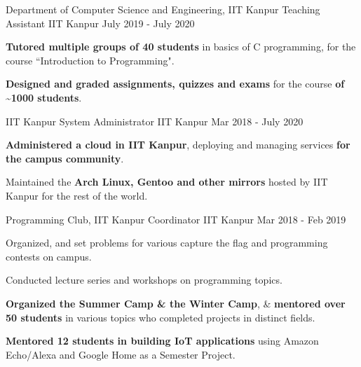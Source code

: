 

\begin{cventries}

  \extraentry
  {Department of Computer Science and Engineering, IIT Kanpur}
  {Teaching Assistant}
  {IIT Kanpur}
  {July 2019 - July 2020}
  {
    \begin{cvitems}
    \item \textbf{Tutored multiple groups of 40 students} in basics of C programming, for the course ``Introduction to Programming".
    \item \textbf{Designed and graded assignments, quizzes and exams} for the course \textbf{of \textasciitilde 1000 students}.
    \end{cvitems}
  }

  \extraentry
  {IIT Kanpur}
  {System Administrator}
  {IIT Kanpur}
  {Mar 2018 - July 2020}
  {
    \begin{cvitems}
    \item \textbf{Administered a cloud in IIT Kanpur}, deploying and managing services \textbf{for the campus community}.
    \item Maintained the \textbf{Arch Linux, Gentoo and other mirrors} hosted by IIT Kanpur for the rest of the world.
    \end{cvitems}
  }

  \extraentry
  {Programming Club, IIT Kanpur}
  {Coordinator}
  {IIT Kanpur}
  {Mar 2018 - Feb 2019}
  {
    \begin{cvitems}
      \item Organized, and set problems for various capture the flag and programming contests on campus.
      \item Conducted lecture series and workshops on programming topics.
      \item \textbf{Organized the Summer Camp \& the Winter Camp}, \& \textbf{mentored over 50 students} in various topics who completed projects in distinct fields.
      \item \textbf{Mentored 12 students in building IoT applications} using Amazon Echo/Alexa and Google Home as a Semester Project.
    \end{cvitems}
  }


\end{cventries}
